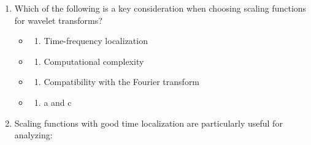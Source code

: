 \documentclass[
  letterpaper,
  DIV=11,
  numbers=noendperiod]{scrartcl}
\providecommand{\tightlist}{%
  \setlength{\itemsep}{0pt}\setlength{\parskip}{0pt}}\usepackage{longtable,booktabs,array}
\begin{document}
\begin{enumerate}
  \begin{itemize}
  \tightlist
  \item
    \begin{enumerate}
    \def\labelenumii{\alph{enumii})}
    \tightlist
    \item
      Compute the transform faster
    \end{enumerate}
  \item
    \begin{enumerate}
    \def\labelenumii{\alph{enumii})}
    \setcounter{enumii}{1}
    \tightlist
    \item
      Accurately represent and analyze the signal
    \end{enumerate}
  \item
    \begin{enumerate}
    \def\labelenumii{\alph{enumii})}
    \setcounter{enumii}{2}
    \tightlist
    \item
      Reduce the memory requirements
    \end{enumerate}
  \item
    \begin{enumerate}
    \def\labelenumii{\alph{enumii})}
    \setcounter{enumii}{3}
    \tightlist
    \item
      All of the above
    \end{enumerate}
  \end{itemize}
\item
  Which of the following is a key consideration when choosing scaling
  functions for wavelet transforms?

  \begin{itemize}
  \tightlist
  \item
    \begin{enumerate}
    \def\labelenumii{\alph{enumii})}
    \tightlist
    \item
      Time-frequency localization
    \end{enumerate}
  \item
    \begin{enumerate}
    \def\labelenumii{\alph{enumii})}
    \setcounter{enumii}{1}
    \tightlist
    \item
      Computational complexity
    \end{enumerate}
  \item
    \begin{enumerate}
    \def\labelenumii{\alph{enumii})}
    \setcounter{enumii}{2}
    \tightlist
    \item
      Compatibility with the Fourier transform
    \end{enumerate}
  \item
    \begin{enumerate}
    \def\labelenumii{\alph{enumii})}
    \setcounter{enumii}{3}
    \tightlist
    \item
      a and c
    \end{enumerate}
  \end{itemize}
\item
  Scaling functions with good time localization are particularly useful
  for analyzing:


\end{enumerate}
\end{document}
